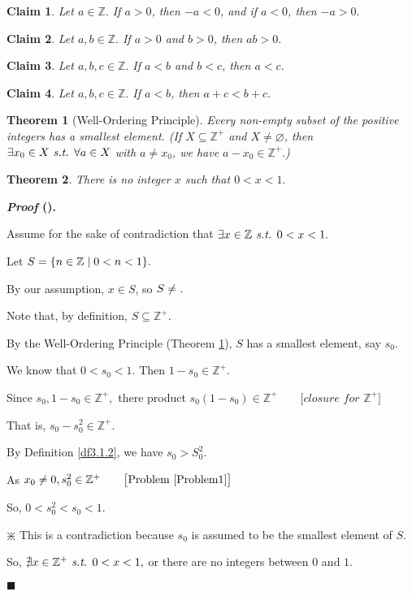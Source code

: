 \documentclass[12pt,a4paper]{article}
\newtheorem{thm}{Theorem}[subsection]
\newtheorem{clm}{Claim}[subsection]
\newcounter{nprf}[subsection]
\newenvironment*{prf}{\par\indent\textbf{\textit{Proof} (\stepcounter{nprf}\thenprf). }\par}{\par\hfill $\blacksquare$\par}
\def\Z{{\mathbb{Z}}}
\def\Zp{{\Z^{+}}}
\def\emptyset{\varnothing}
\def\st{\emph{ s.t. }}
\begin{document}
\begin{clm}
	Let $a\in\Z.$ If $a>0$, then $-a<0$, and if $a<0$, then $-a>0.$	
\end{clm}
\begin{clm}
	Let $a,b\in\Z.$ If $a>0$ and $b>0$, then $ab>0.$
\end{clm}
\begin{clm}
	Let $a,b,c\in\Z.$ If $a<b$ and $b<c$, then $a<c$.
\end{clm}
\begin{clm}
	Let $a,b,c\in\Z.$ If $a<b$, then $a+c<b+c.$
\end{clm}

\begin{thm}[Well-Ordering Principle]\label{thm3.1.1}
	Every non-empty subset of the positive integers has a smallest element. 	(If $X\subseteq\Zp$ and $X\neq\emptyset$, then $\exists x_0\in X\st\forall a\in X$ with $a\neq x_0$, we have $a-x_0\in\Zp.$)
\end{thm}
\begin{framed}
\begin{thm}\label{thm3.1.2}
	There is no integer $x$ such that $0<x<1.$	
\end{thm}
\begin{prf}
	Assume for the sake of contradiction that $\exists x\in\Z\st0<x<1.$\par Let $S=\qty{n\in\Z\mid0<n<1}.$\par By our assumption, $x\in S$, so $S\neq\empty.$\par Note that, by definition, $S\subseteq\Zp$.\par  By the Well-Ordering Principle (Theorem \ref{thm3.1.1}), $S$ has a smallest element, say $s_0$.\par We know that $0<s_0<1$. Then $1-s_0\in\Zp.$\par Since $s_0,1-s_0\in\Zp,$ there product $s_0(1-s_0)\in\Zp\qquad\big[\textit{closure for $\Zp$}\big]$\par That is, $s_0-s_0^2\in\Zp.$\par By Definition \ref{df3.1.2}, we have $s_0>S_0^2.$\par As $x_0\neq0, s_0^2\in\Zp\qquad\big[\text{Problem \ref{Problem1}}\big]$\par So, $0<s_0^2<s_0<1.$\par\begin{center}$\divideontimes$ This is a contradiction because $s_0$ is assumed to be the smallest element of $S$.\end{center}\par So, $\nexists x\in\Zp\st0<x<1,$ or there are no integers between $0$ and $1$.
\end{prf}
\end{framed}
\end{document}

